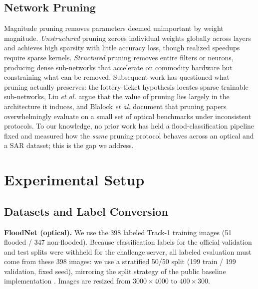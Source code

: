 \documentclass[conference]{IEEEtran}
\begin{document}
\subsection{Network Pruning}
Magnitude pruning removes parameters deemed unimportant by weight
magnitude. \emph{Unstructured} pruning \cite{han2015learning} zeroes
individual weights globally across layers and achieves high sparsity
with little accuracy loss, though realized speedups require sparse
kernels. \emph{Structured} pruning \cite{li2017pruning} removes entire
filters or neurons, producing dense sub-networks that accelerate on
commodity hardware but constraining what can be removed. Subsequent
work has questioned what pruning actually preserves: the lottery-ticket
hypothesis \cite{frankle2019lottery} locates sparse trainable
sub-networks, Liu \emph{et al.} \cite{liu2019rethinking} argue that
the value of pruning lies largely in the architecture it induces, and
Blalock \emph{et al.} \cite{blalock2020state} document that pruning
papers overwhelmingly evaluate on a small set of optical benchmarks
under inconsistent protocols. To our knowledge, no prior work has held
a flood-classification pipeline fixed and measured how the \emph{same}
pruning protocol behaves across an optical and a SAR dataset; this is
the gap we address.

\section{Experimental Setup}
\label{sec:setup}

\subsection{Datasets and Label Conversion}
\textbf{FloodNet (optical).} We use the 398 labeled Track-1 training
images (51 flooded / 347 non-flooded). Because classification labels
for the official validation and test splits were withheld for the
challenge server, all labeled evaluation must come from these 398
images: we use a stratified 50/50 split (199 train / 199 validation,
fixed seed), mirroring the split strategy of the public baseline
implementation \cite{khose2021semisupervised}. Images are resized from
$3000\times4000$ to $400\times300$.
\end{document}
